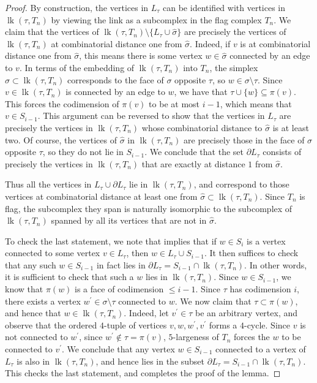 \documentclass[12pt, letterpaper]{article}
\newcommand{\lk}{\operatorname{lk}}
\theoremstyle{plain}
\theoremstyle{definition}
\begin{document}
\begin{proof}
By construction, the vertices in $L_\tau$ can be identified with vertices in $\lk(\tau, T_n)$ by viewing the link as a subcomplex in the flag complex $T_n$. We claim that the vertices of ${\lk(\tau, T_n) \setminus \{L_\tau \cup \hat \sigma\}}$ are precisely the vertices of $\lk(\tau, T_n)$ at combinatorial distance one from $\hat \sigma$. Indeed, if $v$ is at combinatorial distance one from $\hat \sigma$, this means there is some vertex $w\in \hat \sigma$ connected by an edge to $v$. In terms of the embedding of $\lk(\tau, T_n)$ into $T_n$, the simplex $\hat \sigma \subset \lk(\tau, T_n)$ corresponds to the face of $\sigma$ opposite $\tau$, so $w\in \sigma \setminus \tau$. Since $v\in \lk(\tau, T_n)$ is connected by an edge to $w$, we have that $\tau \cup \{w\} \subseteq \pi(v)$. This forces the codimension of $\pi(v)$ to be at most $i-1$, which means that $v\in S_{i-1}$. This argument can be reversed to show that the vertices in $L_\tau$ are precisely the vertices in $\lk(\tau, T_n)$ whose combinatorial distance to $\hat \sigma$ is at least two. Of course, the vertices of $\hat \sigma$ in $\lk(\tau, T_n)$ are precisely those in the face of $\sigma$ opposite $\tau$, so they do not lie in $S_{i-1}$. We conclude that the set $\partial L_\tau$ consists of precisely the vertices in $\lk(\tau, T_n)$ that are exactly at distance $1$ from $\hat \sigma$.

Thus all the vertices in $L_\tau \cup \partial L_\tau$ lie in $\lk(\tau, T_n)$, and correspond to those vertices at combinatorial distance at least one from $\hat \sigma \subset \lk(\tau, T_n)$. Since $T_n$ is flag, the subcomplex they span is naturally isomorphic to the subcomplex of $\lk(\tau, T_n)$ spanned by all its vertices that are not in $\hat \sigma$.

To check the last statement, we note that  implies that if $w\in S_i$ is a vertex connected to some vertex $v\in L_\tau$, then $w\in L_\tau \cup S_{i-1}$. It then suffices to check that any such $w\in S_{i-1}$ in fact lies in $\partial L_\tau = S_{i-1} \cap \lk(\tau, T_n)$. In other words, it is sufficient to check that such a $w$ lies in $\lk(\tau, T_n)$. Since $w\in S_{i-1}$, we know that $\pi(w)$ is a face of codimension $\leq i-1$. Since $\tau$ has codimension $i$, there exists a vertex $w^\prime\in \sigma\setminus \tau$ connected to $w$. We now claim that $\tau \subset \pi(w)$, and hence that $w \in \lk(\tau, T_n)$. Indeed, let $v^\prime \in \tau$ be an arbitrary vertex, and observe that the ordered $4$-tuple of vertices $v, w, w^\prime, v^\prime$ forms a $4$-cycle. Since $v$ is not connected to $w^\prime$, since $w^\prime\notin \tau=\pi(v)$, $5$-largeness of $T_n$ forces the $w$ to be connected to $v^\prime$. We conclude that any vertex $w\in S_{i-1}$ connected to a vertex of $L_\tau$ is also in $\lk(\tau, T_n)$, and hence lies in the subset $\partial L_\tau = S_{i-1} \cap \lk(\tau, T_n)$. This checks the last statement, and completes the proof of the lemma.
\end{proof}
 
\end{document}
